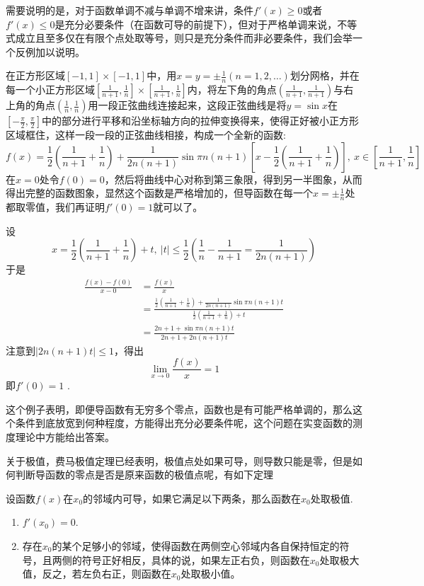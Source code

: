 \begin{example}
需要说明的是，对于函数单调不减与单调不增来讲，条件$f'(x) \geqslant 0$或者$f'(x) \leqslant 0$是充分必要条件（在函数可导的前提下），但对于严格单调来说，不等式成立且至多仅在有限个点处取等号，则只是充分条件而非必要条件，我们会举一个反例加以说明。

在正方形区域$[-1,1]\times[-1,1]$中，用$x=y=\pm \frac{1}{n}(n=1,2,\ldots)$划分网格，并在每一个小正方形区域$[\frac{1}{n+1},\frac{1}{n}] \times [\frac{1}{n+1},\frac{1}{n}]$内，将左下角的角点$\left(\frac{1}{n+1},\frac{1}{n+1}\right)$与右上角的角点$\left(\frac{1}{n},\frac{1}{n}\right)$用一段正弦曲线连接起来，这段正弦曲线是将$y=\sin{x}$在$\left[ -\frac{\pi}{2}, \frac{\pi}{2} \right]$中的部分进行平移和沿坐标轴方向的拉伸变换得来，使得正好被小正方形区域框住，这样一段一段的正弦曲线相接，构成一个全新的函数:
\[ f(x) = \frac{1}{2} \left( \frac{1}{n+1} + \frac{1}{n} \right) + \frac{1}{2n(n+1)} \sin{\pi n(n+1) \left[ x - \frac{1}{2} \left( \frac{1}{n+1} + \frac{1}{n} \right) \right]}, \  x \in \left[ \frac{1}{n+1}, \frac{1}{n} \right] \]
在$x=0$处令$f(0)=0$，然后将曲线中心对称到第三象限，得到另一半图象，从而得出完整的函数图象，显然这个函数是严格增加的，但导函数在每一个$x = \pm \frac{1}{n}$处都取零值，我们再证明$f'(0)=1$就可以了。

设
\[ x = \frac{1}{2} \left( \frac{1}{n+1} + \frac{1}{n} \right) +t, \  |t| \leqslant \frac{1}{2}\left( \frac{1}{n} - \frac{1}{n+1} = \frac{1}{2n(n+1)} \right) \]
于是
\begin{align*}
  \frac{f(x)-f(0)}{x-0} & = \frac{f(x)}{x} \\
                        & = \frac{\frac{1}{2} \left( \frac{1}{n+1} + \frac{1}{n} \right)+\frac{1}{2n(n+1)}\sin{\pi n(n+1)t}}{\frac{1}{2} \left( \frac{1}{n+1} + \frac{1}{n} \right)+t} \\
  & = \frac{2n+1+\sin{\pi n(n+1)t}}{2n+1+2n(n+1)t}
\end{align*}
注意到$|2n(n+1)t| \leqslant 1$，得出
\[ \lim_{x \to 0} \frac{f(x)}{x} = 1 \]
即$f'(0)=1$ .

这个例子表明，即便导函数有无穷多个零点，函数也是有可能严格单调的，那么这个条件到底放宽到何种程度，方能得出充分必要条件呢，这个问题在实变函数的测度理论中方能给出答案。
\end{example}


关于极值，费马极值定理已经表明，极值点处如果可导，则导数只能是零，但是如何判断导函数的零点是否是原来函数的极值点呢，有如下定理
\begin{theorem}
  设函数$f(x)$在$x_0$的邻域内可导，如果它满足以下两条，那么函数在$x_0$处取极值.
  \begin{enumerate}
  \item $f'(x_0)=0$.
  \item 存在$x_0$的某个足够小的邻域，使得函数在两侧空心邻域内各自保持恒定的符号，且两侧的符号正好相反，具体的说，如果左正右负，则函数在$x_0$处取极大值，反之，若左负右正，则函数在$x_0$处取极小值。
  \end{enumerate}
\end{theorem}

